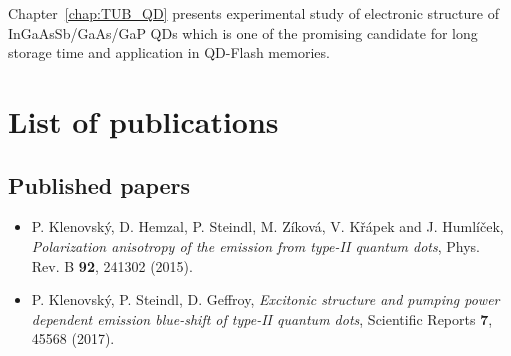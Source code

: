 \documentclass[
a4paper, %
11pt, %
onecolumn, %
openany, %
oldfontcommands,
]{memoir}
\begin{document}
Chapter~\ref{chap:TUB_QD} presents experimental study of electronic structure of InGaAsSb/GaAs/GaP QDs which is one of the promising candidate for long storage time and application in QD-Flash memories.   
\newpage 




\mainmatter

%


%


\appendix






%







\backmatter



%
%
%





%
\chapter{List of publications}\label{chap:publications}

\section*{Published papers}
\begin{itemize}
	\item P. Klenovský, D. Hemzal, P. Steindl, M. Zíková, V. Křápek and J. Humlíček, \textit{Polarization anisotropy of the emission from type-II quantum dots}, Phys. Rev. B \textbf{92}, 241302 (2015).
	\item P. Klenovský, P. Steindl, D. Geffroy, \textit{Excitonic structure and pumping power dependent emission blue-shift of type-II quantum dots}, Scientific Reports \textbf{7}, 45568 (2017).
\end{itemize}
\end{document}
